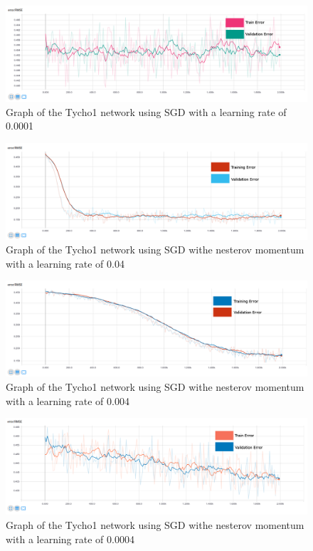 \documentclass[12pt,a4paper,oneside,oldfontcommands]{memoir}
\begin{document}
\begin{Declaration Of OriginalityOrginality}
\begin{figure}[H]
  \centering
    \includegraphics[width=\linewidth]{graphs/A/tycho_1_SGD_0001_sigmoid.png}
    \caption{Graph of the Tycho1 network using SGD with a learning rate of 0.0001}
\end{figure}

\begin{figure}[H]
  \centering
    \includegraphics[width=\linewidth]{graphs/A/tycho_1_NESTEROV_04_sigmoid.png}
    \caption{Graph of the Tycho1 network using SGD withe nesterov momentum with a learning rate of 0.04}
\end{figure}

\begin{figure}[H]
  \centering
    \includegraphics[width=\linewidth]{graphs/A/tycho_1_NESTEROV_004_sigmoid.png}
    \caption{Graph of the Tycho1 network using SGD withe nesterov momentum with a learning rate of 0.004}
\end{figure}

\begin{figure}[H]
  \centering
    \includegraphics[width=\linewidth]{graphs/A/tycho_1_NESTEROV_0004_sigmoid.png}
    \caption{Graph of the Tycho1 network using SGD withe nesterov momentum with a learning rate of 0.0004}
\end{figure}


\end{Declaration Of OriginalityOrginality}
\end{document}
